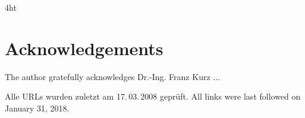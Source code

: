 \documentclass[
               paper=a4,
               twoside,  %
               bibliography=totoc,
               headsepline,
               cleardoublepage=empty,
               parskip=half,
               final   %
               ]{scrbook}
\begin{document}

\listoffigures%
\listoftables%




\iftex4ht
\else
\fi



\renewcommand*{\chapterpagestyle}{scrplain}
\pagestyle{scrheadings}

%
%
%



%
%

\clearpage


\chapter*{Acknowledgements}

The author gratefully acknowledges Dr.-Ing. Franz Kurz ...

\clearpage


\printbibliography

\ifdeutsch
Alle URLs wurden zuletzt am 17.\,03.\,2008 geprüft.
\else
All links were last followed on January 31, 2018.
\fi

\pagestyle{empty}
\renewcommand*{\chapterpagestyle}{empty}
\Versicherung
\end{document}

